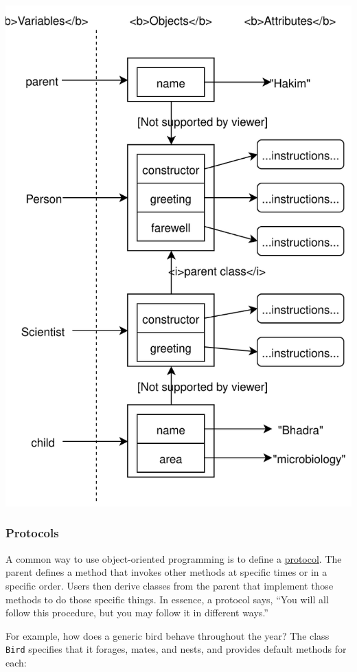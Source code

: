 \includegraphics{../../files/oop-inheritance.svg}

\hypertarget{s:oop-protocols}{\subsubsection{Protocols}\label{s:oop-protocols}}

A common way to use object-oriented programming is to define a
\protect\hyperlink{g:protocol}{protocol}. The parent defines a method
that invokes other methods at specific times or in a specific order.
Users then derive classes from the parent that implement those methods
to do those specific things. In essence, a protocol says, ``You will all
follow this procedure, but you may follow it in different ways.''

For example, how does a generic bird behave throughout the year? The
class \texttt{Bird} specifies that it forages, mates, and nests, and
provides default methods for each:

